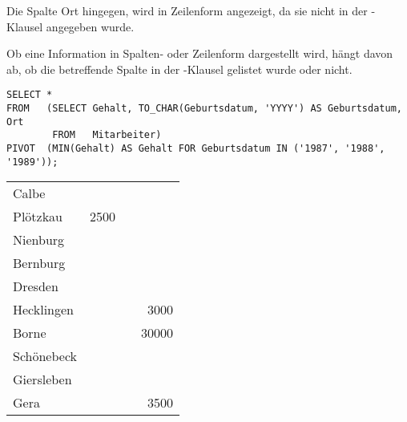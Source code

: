 Die Spalte Ort hingegen, wird in Zeilenform angezeigt, da sie nicht in der -Klausel angegeben wurde.

\begin{merke}
    Ob eine Information in Spalten- oder Zeilenform dargestellt wird, hängt davon ab, ob die betreffende Spalte in der -Klausel gelistet wurde oder nicht.
\end{merke}
\begin{lstlisting}[language=oracle_sql,caption={Zusätzliche Gruppierungen in einer Pivot-Abfrage},label=sql06_21]
SELECT *
FROM   (SELECT Gehalt, TO_CHAR(Geburtsdatum, 'YYYY') AS Geburtsdatum, Ort
        FROM   Mitarbeiter)
PIVOT  (MIN(Gehalt) AS Gehalt FOR Geburtsdatum IN ('1987', '1988', '1989'));
          \end{lstlisting}
\begin{center}
    \begin{small}
        \tablehead{}
        \begin{oraclesql}
            \begin{supertabular}{lrrr}
                Calbe &  &  &  \\
                Plötzkau & 2500 &  &  \\
                Nienburg &  &  &  \\
                Bernburg &  &  &  \\
                Dresden &  &  &  \\
                Hecklingen &  &  & 3000 \\
                Borne &  &  & 30000 \\
                Schönebeck &  &  &  \\
                Giersleben &  &  &  \\
                Gera &  &  & 3500 \\

\end{supertabular}
\end{oraclesql}
\end{small}
\end{center}
